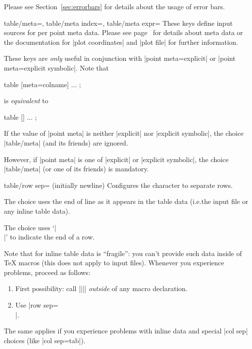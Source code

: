 {\begin{pgfplotsxykeylist}
    Please see Section~\ref{sec:errorbars} for details about the usage of error
    bars.
\end{pgfplotsxykeylist}

\begin{pgfplotsxykeylist}{%
    table/meta=,
    table/meta index=,
    table/meta expr=%
}
    These keys define input sources for per point meta data. Please see
    page~\pageref{pgfplots:scatter:src} for details about meta data or the
    documentation for |plot coordinates| and |plot file| for further
    information.

    These keys are \emph{only} useful in conjunction with |point meta=explicit|
    or |point meta=explicit symbolic|. Note that
\begin{codeexample}
\addplot [point meta=explicit] table [meta=colname] ... ;
\end{codeexample}
    is \emph{equivalent} to
\begin{codeexample}
\addplot [point meta=\thisrow{colname}] table [] ... ;
\end{codeexample}
    If the value of |point meta| is neither |explicit| nor |explicit symbolic|,
    the choice |table/meta| (and its friends) are ignored.

    However, if |point meta| is one of |explicit| or |explicit symbolic|, the
    choice |table/meta| (or one of its friends) is mandatory.
\end{pgfplotsxykeylist}


\begin{pgfplotskey}{table/row sep= (initially newline)}
    Configures the character to separate rows.

    The choice  uses the end of line as it appears in the
    table data (i.e.\@ the input file or any inline table data).

    The choice \declaretext{\string\\} uses `|\\|' to indicate the end of a row.

    Note that  for inline table data is ``fragile'': you
    can't provide such data inside of \TeX{} macros (this does not apply to
    input files). Whenever you experience problems, proceed as follows:
    \begin{enumerate}
        \item First possibility: call
            |\pgfplotstableread||\yourmacro| \emph{outside} of any
            macro declaration.
        \item Use |row sep=\\|.
    \end{enumerate}
    The same applies if you experience problems with inline data and special
    |col sep| choices (like |col sep=tab|).


\end{pgfplotskey}}
